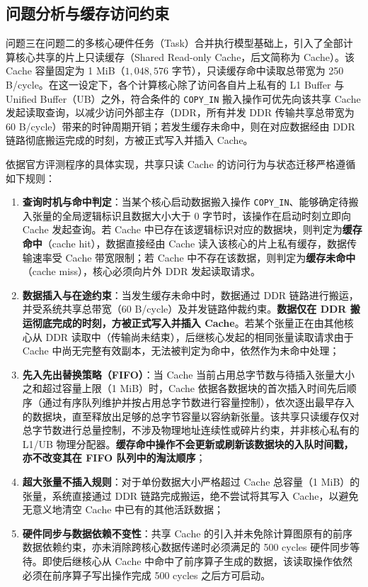 \documentclass[anonymous,withtoc]{gmcm2026}
\providecommand{\tightlist}{\setlength{\itemsep}{0pt}\setlength{\parskip}{0pt}}
\begin{document}
\subsection{问题分析与缓存访问约束}

问题三在问题二的多核心硬件任务（Task）合并执行模型基础上，引入了全部计算核心共享的片上只读缓存（Shared Read-only Cache，后文简称为 Cache）。该 Cache 容量固定为 1 MiB（\(1{,}048{,}576\) 字节），只读缓存命中读取总带宽为 250 B/cycle。在这一设定下，各个计算核心除了访问各自片上私有的 L1 Buffer 与 Unified Buffer（UB）之外，符合条件的 \texttt{COPY\_IN} 搬入操作可优先向该共享 Cache 发起读取查询，以减少访问外部主存（DDR，所有并发 DDR 传输共享总带宽为 60 B/cycle）带来的时钟周期开销；若发生缓存未命中，则在对应数据经由 DDR 链路彻底搬运完成的时刻，方被正式写入并插入 Cache。

依据官方评测程序的具体实现，共享只读 Cache 的访问行为与状态迁移严格遵循如下规则：

\begin{enumerate}
\def\labelenumi{\arabic{enumi}.}
\tightlist
\item
  \textbf{查询时机与命中判定}：当某个核心启动数据搬入操作 \texttt{COPY\_IN}、能够确定待搬入张量的全局逻辑标识且数据大小大于 0 字节时，该操作在启动时刻立即向 Cache 发起查询。若 Cache 中已存在该逻辑标识对应的数据块，则判定为\textbf{缓存命中}（cache hit），数据直接经由 Cache 读入该核心的片上私有缓存，数据传输速率受 Cache 带宽限制；若 Cache 中不存在该数据，则判定为\textbf{缓存未命中}（cache miss），核心必须向片外 DDR 发起读取请求。
\item
  \textbf{数据插入与在途约束}：当发生缓存未命中时，数据通过 DDR 链路进行搬运，并受系统共享总带宽（60 B/cycle）及并发链路仲裁约束。\textbf{数据仅在 DDR 搬运彻底完成的时刻，方被正式写入并插入 Cache}。若某个张量正在由其他核心从 DDR 读取中（传输尚未结束），后继核心发起的相同张量读取请求由于 Cache 中尚无完整有效副本，无法被判定为命中，依然作为未命中处理；
\item
  \textbf{先入先出替换策略（FIFO）}：当 Cache 当前占用总字节数与待插入张量大小之和超过容量上限（1 MiB）时，Cache 依据各数据块的首次插入时间先后顺序（通过有序队列维护并按占用总字节数进行容量控制），依次逐出最早存入的数据块，直至释放出足够的总字节容量以容纳新张量。该共享只读缓存仅对总字节数进行总量控制，不涉及物理地址连续性或碎片约束，并非核心私有的 L1/UB 物理分配器。\textbf{缓存命中操作不会更新或刷新该数据块的入队时间戳，亦不改变其在 FIFO 队列中的淘汰顺序}；
\item
  \textbf{超大张量不插入规则}：对于单份数据大小严格超过 Cache 总容量（1 MiB）的张量，系统直接通过 DDR 链路完成搬运，绝不尝试将其写入 Cache，以避免无意义地清空 Cache 中已有的其他活跃数据；
\item
  \textbf{硬件同步与数据依赖不变性}：共享 Cache 的引入并未免除计算图原有的前序数据依赖约束，亦未消除跨核心数据传递时必须满足的 500 cycles 硬件同步等待。即使后继核心从 Cache 中命中了前序算子生成的数据，该读取操作依然必须在前序算子写出操作完成 500 cycles 之后方可启动。
\end{enumerate}
\end{document}
